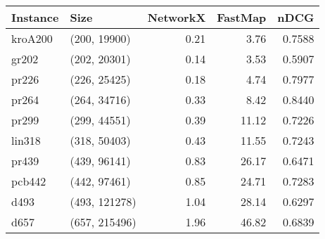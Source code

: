 \begin{tabular}{llrrr}
\toprule
Instance &          Size &  NetworkX &  FastMap &   nDCG \\
\midrule
 kroA200 &  (200, 19900) &      0.21 &     3.76 & 0.7588 \\
   gr202 &  (202, 20301) &      0.14 &     3.53 & 0.5907 \\
   pr226 &  (226, 25425) &      0.18 &     4.74 & 0.7977 \\
   pr264 &  (264, 34716) &      0.33 &     8.42 & 0.8440 \\
   pr299 &  (299, 44551) &      0.39 &    11.12 & 0.7226 \\
  lin318 &  (318, 50403) &      0.43 &    11.55 & 0.7243 \\
   pr439 &  (439, 96141) &      0.83 &    26.17 & 0.6471 \\
  pcb442 &  (442, 97461) &      0.85 &    24.71 & 0.7283 \\
    d493 & (493, 121278) &      1.04 &    28.14 & 0.6297 \\
    d657 & (657, 215496) &      1.96 &    46.82 & 0.6839 \\
\bottomrule
\end{tabular}
